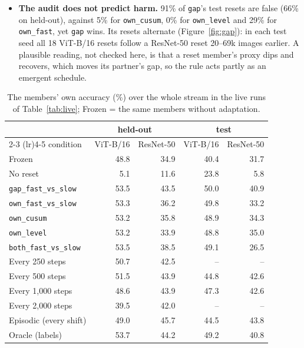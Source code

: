 \documentclass[10pt]{article}
\newcommand{\rl}[1]{\texttt{#1}}
\newcommand{\vit}{ViT-B/16}
\newcommand{\rn}{ResNet-50}
\begin{document}
\begin{itemize}
  \item \textbf{The audit does not predict harm.} 91\% of \rl{gap}'s test resets are false (66\% on held-out), against 5\% for \rl{own\_cusum}, 0\% for \rl{own\_level} and 29\% for \rl{own\_fast}, yet \rl{gap} wins. Its resets alternate (Figure~\ref{fig:gap}): in each test seed all 18 \vit{} resets follow a \rn{} reset 20--69k images earlier. A plausible reading, not checked here, is that a reset member's proxy dips and recovers, which moves its partner's gap, so the rule acts partly as an emergent schedule.
\end{itemize}

\begin{table}[t]
  \centering\footnotesize\setlength{\tabcolsep}{5pt}
  \caption{The members' own accuracy (\%) over the whole stream in the live runs of Table~\ref{tab:live}; Frozen = the same members without adaptation.}
  \label{tab:livemem}
  \begin{tabular}{@{}l rr rr@{}}
    \toprule
    & \multicolumn{2}{c}{held-out} & \multicolumn{2}{c}{test} \\
    \cmidrule(lr){2-3} \cmidrule(lr){4-5}
    condition & \vit{} & \rn{} & \vit{} & \rn{} \\
    \midrule
    Frozen & 48.8 & 34.9 & 40.4 & 31.7 \\
    \midrule
    No reset & 5.1 & 11.6 & 23.8 & 5.8 \\
    \midrule
    \rl{gap\_fast\_vs\_slow} & 53.5 & 43.5 & 50.0 & 40.9 \\
    \rl{own\_fast\_vs\_slow} & 53.3 & 36.2 & 49.8 & 33.2 \\
    \rl{own\_cusum} & 53.2 & 35.8 & 48.9 & 34.3 \\
    \rl{own\_level} & 53.2 & 33.9 & 48.8 & 35.0 \\
    \rl{both\_fast\_vs\_slow} & 53.5 & 38.5 & 49.1 & 26.5 \\
    \midrule
    Every 250 steps & 50.7 & 42.5 & -- & -- \\
    Every 500 steps & 51.5 & 43.9 & 44.8 & 42.6 \\
    Every 1,000 steps & 48.6 & 43.9 & 47.3 & 42.6 \\
    Every 2,000 steps & 39.5 & 42.0 & -- & -- \\
    \midrule
    Episodic (every shift) & 49.0 & 45.7 & 44.5 & 43.8 \\
    Oracle (labels) & 53.7 & 44.2 & 49.2 & 40.8 \\
    \bottomrule
  \end{tabular}
\end{table}
\end{document}
